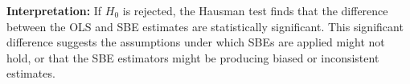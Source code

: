 \textbf{Interpretation:} If  $H_0$ is rejected, the Hausman test finds that the difference between the OLS and SBE estimates are statistically significant. This significant difference suggests the assumptions under which SBEs are applied might not hold, or that the SBE estimators might be producing biased or inconsistent estimates. 
